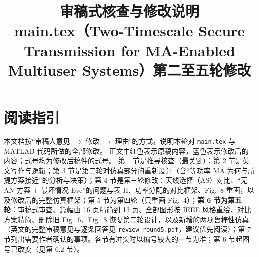 \documentclass[11pt,a4paper]{ctexart}
\title{审稿式核查与修改说明\\[2pt]\large main.tex（Two-Timescale Secure Transmission for MA-Enabled Multiuser Systems）第二至五轮修改}
\author{}
\date{}
\newcommand{\code}[1]{\texttt{#1}}
\newcommand{\old}[1]{{\color{red!70!black}#1}}
\newcommand{\new}[1]{{\color{blue!60!black}#1}}
\begin{document}
\maketitle

\section*{阅读指引}
本文档按“审稿人意见 $\to$ 修改 $\to$ 理由”的方式，说明本轮对 \code{main.tex} 与 MATLAB 代码所做的全部修改。
正文中\old{红色}表示原稿内容，\new{蓝色}表示修改后的内容；式号均为修改后稿件的式号。
第 1 节是推导核查（最关键）；第 2 节是英文写作与逻辑；第 3 节是第二轮对仿真部分的重新设计（含“等功率 MA 为何与所提方案接近”的分析与决策）；第 4 节是第三轮修改：天线选择（AS）对比、“无 AN 方案 + 最坏情况 Eve”的问题与表 II、功率分配的对比框架、Fig.~8 重画，以及修改后的完整仿真框架；第 5 节为第四轮（只重画 Fig.~4）；\textbf{第 6 节为第五轮}：审稿式审查、篇幅由 16 页精简到 13 页、全部图形按 IEEE 风格重绘、对比方案精简、删除旧 Fig.~6、Fig.~8 恢复第二轮设计，以及新增的两项鲁棒性仿真（英文的完整审稿意见与逐条回答见 \code{review\_round5.pdf}，建议优先阅读）；第 7 节列出需要作者确认的事项。各节有冲突时以编号较大的一节为准；第 6 节起图号已改变（见第 6.2 节）。
\end{document}
